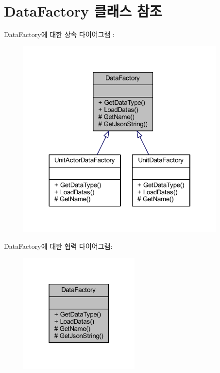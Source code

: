 \hypertarget{class_data_factory}{}\section{Data\+Factory 클래스 참조}
\label{class_data_factory}


Data\+Factory에 대한 상속 다이어그램 \+: 
\nopagebreak
\begin{figure}[H]
\begin{center}
\leavevmode
\includegraphics[width=298pt]{class_data_factory__inherit__graph}
\end{center}
\end{figure}


Data\+Factory에 대한 협력 다이어그램\+:\nopagebreak
\begin{figure}[H]
\begin{center}
\leavevmode
\includegraphics[width=172pt]{class_data_factory__coll__graph}
\end{center}
\end{figure}
